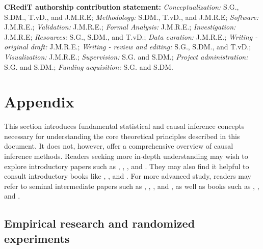 \documentclass[
  authoryear,
  review,
  1p]{elsarticle}
\begin{document}
\textbf{CRediT authorship contribution statement:}
\emph{Conceptualization:} S.G., S.DM., T.vD., and J.M.R.E;
\emph{Methodology:} S.DM., T.vD., and J.M.R.E; \emph{Software:}
J.M.R.E.; \emph{Validation:} J.M.R.E.; \emph{Formal Analysis:} J.M.R.E.;
\emph{Investigation:} J.M.R.E; \emph{Resources:} S.G., S.DM., and T.vD.;
\emph{Data curation:} J.M.R.E.; \emph{Writing - original draft:}
J.M.R.E.; \emph{Writing - review and editing:} S.G., S.DM., and T.vD.;
\emph{Visualization:} J.M.R.E.; \emph{Supervision:} S.G. and S.DM.;
\emph{Project administration:} S.G. and S.DM.; \emph{Funding
acquisition:} S.G. and S.DM.

\newpage{}

\section{Appendix}\label{sec-appendix}

This section introduces fundamental statistical and causal inference
concepts necessary for understanding the core theoretical principles
described in this document. It does not, however, offer a comprehensive
overview of causal inference methods. Readers seeking more in-depth
understanding may wish to explore introductory papers such as
\citet{Pearl_2010}, \citet{Rohrer_2018}, \citet{Pearl_2019}, and
\citet{Cinelli_et_al_2020}. They may also find it helpful to consult
introductory books like \citet{Pearl_et_al_2018}, \citet{Neal_2020}, and
\citet{McElreath_2020}. For more advanced study, readers may refer to
seminal intermediate papers such as \citet{Neyman_et_al_1923},
\citet{Rubin_1974}, \citet{Spirtes_et_al_1991}, and \citet{Sekhon_2009},
as well as books such as \citet{Pearl_2009}, \citet{Morgan_et_al_2014},
and \citet{Hernan_et_al_2020}.

\newcommand{\dsep}{\:\bot\:}
\newcommand{\ndsep}{\:\not\bot\:}
\newcommand{\cond}{\:|\:}

\subsection{Empirical research and randomized
experiments}\label{sec-appendix-A}
\end{document}
